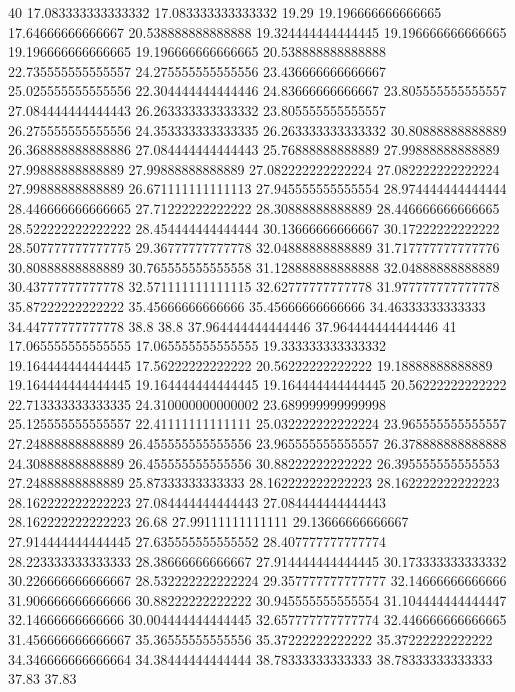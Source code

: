 40 17.083333333333332 17.083333333333332 19.29 19.196666666666665 17.64666666666667 20.538888888888888 19.324444444444445 19.196666666666665 19.196666666666665 19.196666666666665 20.538888888888888 22.735555555555557 24.275555555555556 23.436666666666667 25.025555555555556 22.304444444444446 24.83666666666667 23.805555555555557 27.084444444444443 26.263333333333332 23.805555555555557 26.275555555555556 24.353333333333335 26.263333333333332 30.80888888888889 26.368888888888886 27.084444444444443 25.76888888888889 27.99888888888889 27.99888888888889 27.99888888888889 27.082222222222224 27.082222222222224 27.99888888888889 26.671111111111113 27.945555555555554 28.974444444444444 28.446666666666665 27.71222222222222 28.30888888888889 28.446666666666665 28.522222222222222 28.454444444444444 30.13666666666667 30.17222222222222 28.507777777777775 29.36777777777778 32.04888888888889 31.717777777777776 30.80888888888889 30.765555555555558 31.128888888888888 32.04888888888889 30.43777777777778 32.571111111111115 32.62777777777778 31.977777777777778 35.87222222222222 35.45666666666666 35.45666666666666 34.46333333333333 34.44777777777778 38.8 38.8 37.964444444444446 37.964444444444446
41 17.065555555555555 17.065555555555555 19.333333333333332 19.164444444444445 17.56222222222222 20.56222222222222 19.18888888888889 19.164444444444445 19.164444444444445 19.164444444444445 20.56222222222222 22.713333333333335 24.310000000000002 23.689999999999998 25.125555555555557 22.41111111111111 25.032222222222224 23.965555555555557 27.24888888888889 26.455555555555556 23.965555555555557 26.378888888888888 24.30888888888889 26.455555555555556 30.88222222222222 26.395555555555553 27.24888888888889 25.87333333333333 28.162222222222223 28.162222222222223 28.162222222222223 27.084444444444443 27.084444444444443 28.162222222222223 26.68 27.99111111111111 29.13666666666667 27.914444444444445 27.635555555555552 28.407777777777774 28.223333333333333 28.38666666666667 27.914444444444445 30.173333333333332 30.226666666666667 28.532222222222224 29.357777777777777 32.14666666666666 31.906666666666666 30.88222222222222 30.945555555555554 31.104444444444447 32.14666666666666 30.004444444444445 32.657777777777774 32.446666666666665 31.456666666666667 35.36555555555556 35.37222222222222 35.37222222222222 34.346666666666664 34.38444444444444 38.78333333333333 38.78333333333333 37.83 37.83
